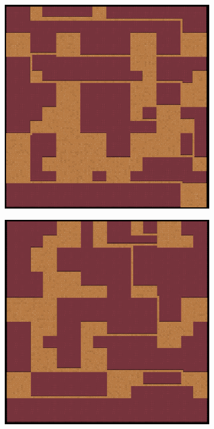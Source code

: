 \begin{figure}[H]
\begin{subfigure}{.5\textwidth}
  \includegraphics[width=.8\linewidth]{../images/pcg_quadtree/pcg3.png}
  \label{fig:sfig1}
\end{subfigure}%
\begin{subfigure}{.5\textwidth}
  \centering
  \includegraphics[width=.8\linewidth]{../images/pcg_quadtree/pcg4.png}
  \label{fig:sfig2}
\end{subfigure}
\begin{subfigure}{.5\textwidth}
  \centering

\end{subfigure}
\end{figure}
